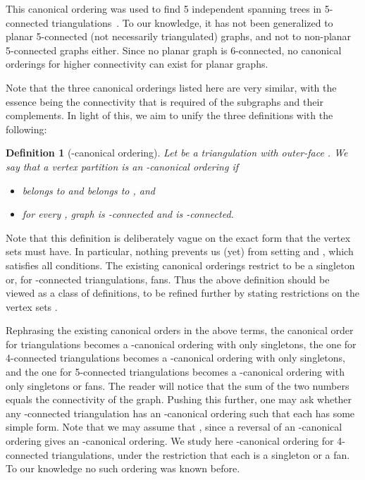 \documentclass[12pt]{article}
\newtheorem{definition}{Definition}
\begin{document}
This canonical ordering was used to find 5 independent spanning trees in 5-connected triangulations~\cite{NN00}. To our knowledge, it has not been generalized to planar 5-connected (not necessarily triangulated) graphs, and not to non-planar 5-connected graphs either.    Since no planar graph is 6-connected, no canonical orderings for higher connectivity can exist for planar graphs.

Note that the three canonical orderings listed here are very similar, with the essence being the
connectivity that is required of the subgraphs and their complements.
In light of this, we 
aim to unify the three definitions with the following:

\begin{definition}[-canonical ordering]
Let  be a triangulation with outer-face .
We say that 
a vertex partition  
is an \emph{-canonical ordering} if 
\begin{itemize}
\item  belongs to  and  belongs to , and
\item for every , graph  is -connected and  is -connected.
\end{itemize}
\end{definition}

Note that this definition is deliberately vague on the exact form that the vertex sets  must have.
In particular, nothing prevents us (yet) from setting  and , which satisfies all conditions.
The existing canonical orderings restrict  to be a singleton or, for -connected triangulations, fans.
Thus the above definition should be viewed as a class of definitions, to be refined further by
stating restrictions on the vertex sets .

Rephrasing the existing canonical orders in the above terms,
the canonical order for triangulations becomes a -canonical ordering with only singletons, the one for 4-connected triangulations becomes a -canonical ordering with only singletons, and the one for 5-connected triangulations becomes a -canonical ordering with only singletons or fans. The reader will notice that the sum of the two numbers equals the connectivity of the graph.  Pushing this further, one may ask whether any -connected
triangulation has an -canonical ordering such that each  has some simple form.
Note that we may assume that , since a reversal of an -canonical ordering gives an -canonical ordering.
We study here -canonical ordering for 4-connected triangulations, under the restriction that each  is a singleton or a fan.
To our knowledge no such ordering was known before.
\end{document}
